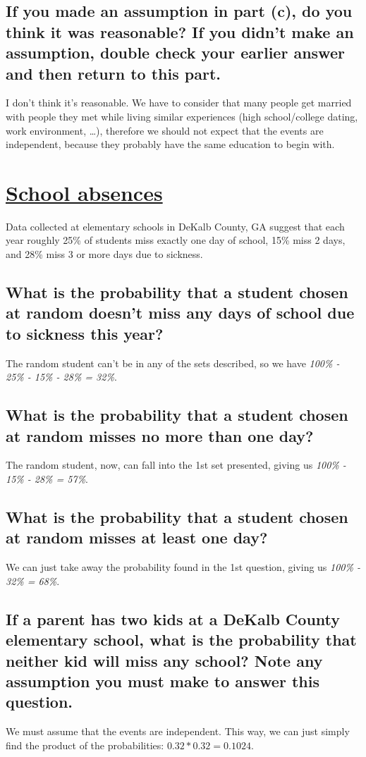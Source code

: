 \documentclass[11pt]{article}
\begin{document}
\subsection{If you made an assumption in part (c), do you think it was reasonable? If you didn't make an assumption, double check your earlier answer and then return to this part.}
\label{sec:orgd6b18b5}
I don't think it's reasonable. We have to consider that many people get married with people they met while living similar experiences (high school/college dating, work environment, \ldots{}), therefore we should not expect that the events are independent, because they probably have the same education to begin with.
\section{\underline{School absences}}
\label{sec:orgaeac4e1}
Data collected at elementary schools in DeKalb County, GA suggest that each year roughly 25\% of students miss exactly one day of school, 15\% miss 2 days, and 28\% miss 3 or more days due to sickness.
\subsection{What is the probability that a student chosen at random doesn't miss any days of school due to sickness this year?}
\label{sec:org7488304}
The random student can't be in any of the sets described, so we have \emph{100\% - 25\% - 15\% - 28\% = 32\%}.
\subsection{What is the probability that a student chosen at random misses no more than one day?}
\label{sec:org18a9eca}
The random student, now, can fall into the 1st set presented, giving us \emph{100\% - 15\% - 28\% = 57\%}.
\subsection{What is the probability that a student chosen at random misses at least one day?}
\label{sec:org1c06628}
We can just take away the probability found in the 1st question, giving us \emph{100\% - 32\% = 68\%}.
\subsection{If a parent has two kids at a DeKalb County elementary school, what is the probability that neither kid will miss any school? Note any assumption you must make to answer this question.}
\label{sec:org5868862}
We must assume that the events are independent. This way, we can just simply find the product of the probabilities: \(0.32 * 0.32 = 0.1024\).
\end{document}
